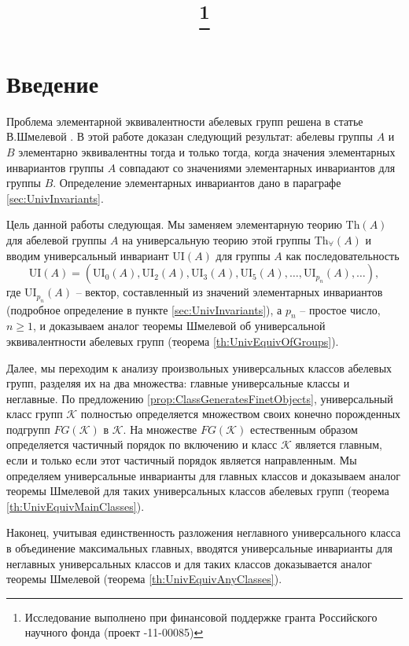 \documentclass[a4paper,11pt,twoside]{article}
\title{\titles\footnote{Исследование выполнено при финансовой поддержке гранта Российского научного фонда (проект \textnumero14-11-00085)}}
\author{\authors}
\gdef\firstpage{1}
\def\K{{\mathcal{K}}}
\def\Th{{\mathrm{Th}}}
\def\Tha{{\mathrm{Th}_\forall}}
\def\ui{{\mathrm{UI}}}
\begin{document}
\maketitle

\tableofcontents


\setcounter{page}{\firstpage}
\pagestyle{newpstyle}

\Russian
\sloppy
\rm


\section{Введение}

Проблема элементарной эквивалентности абелевых групп решена в статье В.Шмелевой \cite{Szm}. В этой работе доказан следующий результат: абелевы группы $A$ и $B$ элементарно эквивалентны тогда и только тогда, когда значения элементарных инвариантов группы $A$ совпадают со значениями элементарных инвариантов для группы $B$. Определение элементарных инвариантов дано в параграфе \ref{sec:UnivInvariants}.

Цель данной работы следующая. Мы заменяем элементарную теорию $\Th(A)$ для абелевой группы $A$ на универсальную теорию этой группы $\Tha(A)$ и вводим универсальный инвариант $\ui(A)$ для группы $A$ как последовательность 
$$\ui(A) = (\ui_0(A), \ui_2(A), \ui_3(A), \ui_5(A), \ldots, \ui_{p_n}(A), \ldots ),$$
где $\ui_{p_n}(A)$ -- вектор, составленный из значений элементарных инвариантов (подробное определение в пункте \ref{sec:UnivInvariants}), а $p_n$ -- простое число, $n \geq 1$, и доказываем аналог теоремы Шмелевой об универсальной эквивалентности абелевых групп (теорема \ref{th:UnivEquivOfGroups}).

Далее, мы переходим к анализу произвольных универсальных классов абелевых групп, разделяя их на два множества: главные универсальные классы и неглавные. По предложению \ref{prop:ClassGeneratesFinetObjects}, универсальный класс групп $\K$ полностью определяется множеством своих конечно порожденных подгрупп $FG(\K)$ в $\K$. На множестве $FG(\K)$ естественным образом определяется частичный порядок по включению и класс $\K$ является главным, если и только если этот частичный порядок является направленным. Мы определяем универсальные инварианты для главных классов и доказываем аналог теоремы Шмелевой для таких универсальных классов абелевых групп (теорема \ref{th:UnivEquivMainClasses}).

Наконец, учитывая единственность разложения неглавного универсального класса в объединение максимальных главных, вводятся универсальные инварианты для неглавных универсальных классов и для таких классов доказывается аналог теоремы Шмелевой (теорема \ref{th:UnivEquivAnyClasses}).
\end{document}
